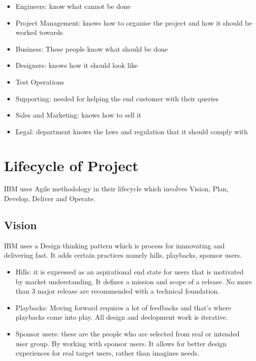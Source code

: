 \documentclass[10pt]{article}
\begin{document}
\begin{itemize}
    \item Engineers: know what cannot be done
    \item Project Management: knows how to organise the project and how it should be worked towards
    \item Business: These people know what should be done
    \item Designers: knows how it should look like
    \item Test Operations
    \item Supporting: needed for helping the end customer with their queries
    \item Sales and Marketing: knows how to sell it
    \item Legal: department knows the laws and regulation that it should comply with
\end{itemize}

\section{Lifecycle of Project}

IBM uses Agile methodology in their lifecycle which involves Vision, Plan, Develop, Deliver and Operate.

\subsection{Vision}

IBM uses a Design thinking pattern which is process for innnovating and delivering fast. It adds certain practices namely hills, playbacks, sponsor users.

\begin{itemize}
    \item Hills: it is expressed as an aspirational end state for users that is motivated by market understanding. It defines a mission and scope of a release. No more than 3 major release are recommended with a technical foundation.
    \item Playbacks: Moving forward requires a lot of feedbacks and that's where playbacks come into play. All design and deelopment work is iterative.
    \item Sponsor users: these are the people who are selected from real or intended user group. By working with sponsor users. It allows for better design experiences for real target users, rather than imagines needs.
\end{itemize}
\end{document}
